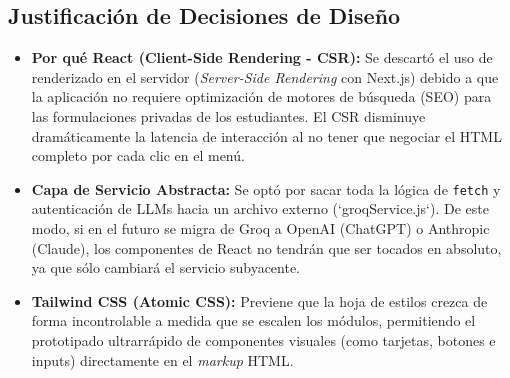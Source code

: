 \subsection{Justificación de Decisiones de Diseño}
\begin{itemize}
    \item \textbf{Por qué React (Client-Side Rendering - CSR):} Se descartó el uso de renderizado en el servidor (\textit{Server-Side Rendering} con Next.js) debido a que la aplicación no requiere optimización de motores de búsqueda (SEO) para las formulaciones privadas de los estudiantes. El CSR disminuye dramáticamente la latencia de interacción al no tener que negociar el HTML completo por cada clic en el menú.
    \item \textbf{Capa de Servicio Abstracta:} Se optó por sacar toda la lógica de \texttt{fetch} y autenticación de LLMs hacia un archivo externo (`groqService.js`). De este modo, si en el futuro se migra de Groq a OpenAI (ChatGPT) o Anthropic (Claude), los componentes de React no tendrán que ser tocados en absoluto, ya que sólo cambiará el servicio subyacente.
    \item \textbf{Tailwind CSS (Atomic CSS):} Previene que la hoja de estilos crezca de forma incontrolable a medida que se escalen los módulos, permitiendo el prototipado ultrarrápido de componentes visuales (como tarjetas, botones e inputs) directamente en el \textit{markup} HTML.
\end{itemize}
